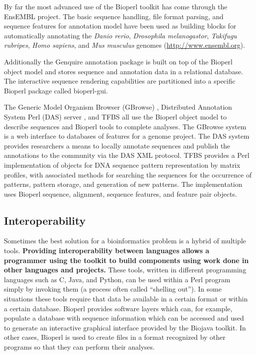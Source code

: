 \documentclass[12pt]{article}
\begin{document}
By far the most advanced use of the Bioperl toolkit has come through
the EnsEMBL \cite{ensembl-nar} project.  The basic sequence handling,
file format parsing, and sequence features for annotation model have
been used as building blocks for automatically annotating the
\textit{Danio rerio}, \textit{Drosophila melanogastor},
\textit{Takifugu rubripes}, \textit{Homo sapiens}, and \textit{Mus
musculus} genomes (\url{http://www.ensembl.org}).

Additionally the Genquire \cite{genquire} annotation package is built
on top of the Bioperl object model and stores sequence and annotation
data in a relational database.  The interactive sequence rendering
capabilities are partitioned into a specific Bioperl package called
bioperl-gui.

The Generic Model Organism Browser (GBrowse) \cite{gmod}, Distributed
Annotation System Perl (DAS) server \cite{das}, and TFBS \cite{tfbs}
all use the Bioperl object model to describe sequences and Bioperl
tools to complete analyses.  The GBrowse system is a web interface to
databases of features for a genome project.  The DAS system provides
researchers a means to locally annotate sequences and publish the
annotations to the community via the DAS XML protocol.  TFBS provides
a Perl implementation of objects for DNA sequence pattern
representation by matrix profiles, with associated methods for
searching the sequences for the occurrence of patterns, pattern
storage, and generation of new patterns. The implementation uses
Bioperl sequence, alignment, sequence features, and feature pair
objects.

\subsection{Interoperability}

Sometimes the best solution for a bioinformatics problem is a hybrid
of multiple tools.  \textbf{Providing interoperability between languages
allows a programmer using the toolkit to build components using
work done in other languages and projects.} 
These tools, written in different programming languages such as C,
Java, and Python, can be used within a Perl program simply by invoking
them (a process often called ``shelling out'').  In some situations
these tools require that data be available in a certain format or
within a certain database.  Bioperl provides software layers which
can, for example, populate a database with sequence information which
can be accessed and used to generate an interactive graphical
interface provided by the Biojava toolkit.  In other cases, Bioperl is
used to create files in a format recognized by other programs so that
they can perform their analyses.
\end{document}
